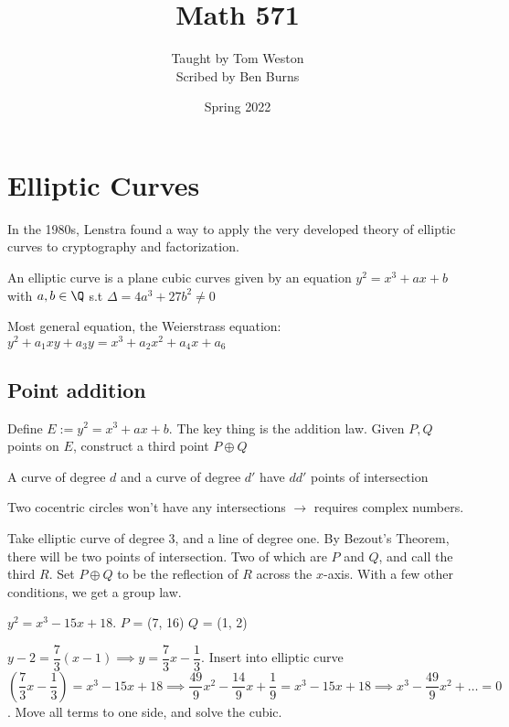 \documentclass[twoside, 10pt]{article}
\title{Math 571}
\author{Taught by Tom Weston \\ Scribed by Ben Burns}
\affil{UMass Amherst}
\date{Spring 2022}
\begin{document}
\maketitle\thispagestyle{firstpage}

\tableofcontents

\section{Elliptic Curves}
In the 1980s, Lenstra found a way to apply the very developed theory of elliptic curves to cryptography and factorization. 

\begin{defn}
    An elliptic curve is a plane cubic curves given by an equation $y^2 = x^3 + ax + b$ with $a, b \in \Q$ s.t $\Delta = 4a^3 + 27b^2 \neq 0$
\end{defn}

\begin{rmk}
    Most general equation, the Weierstrass equation: $y^2 + a_1xy + a_3y = x^3 + a_2x^2 + a_4x + a_6$
\end{rmk}

\subsection{Point addition}
Define $E := y^2 = x^3 + ax + b$. The key thing is the addition law. Given $P, Q$ points on $E$, construct a third point $P \oplus Q$

\begin{thm}
    A curve of degree $d$ and a curve of degree $d'$ have $dd'$ points of intersection
\end{thm}
Two cocentric circles won't have any intersections $\to$ requires complex numbers. 

Take elliptic curve of degree 3, and a line of degree one. By Bezout's Theorem, there will be two points of intersection. Two of which are $P$ and $Q$, and call the third $R$. Set $P \oplus Q$ to be the reflection of $R$ across the $x$-axis. With a few other conditions, we get a group law.

\begin{exm*}
    $y^2 = x^3 - 15x + 18$. $P$ = (7, 16) $Q$ = (1, 2)
\end{exm*}
$y - 2 = \dfrac{7}{3}(x-1) \implies y = \dfrac{7}{3}x - \dfrac{1}{3}$. Insert into elliptic curve $(\dfrac{7}{3}x - \dfrac{1}{3}) = x^3 - 15x + 18 \implies \dfrac{49}{9}x^2 - \dfrac{14}{9}x + \dfrac{1}{9} = x^3 - 15x + 18 \implies x^3 - \dfrac{49}{9}x^2 + \ldots = 0$. Move all terms to one side, and solve the cubic. 
\end{document}
